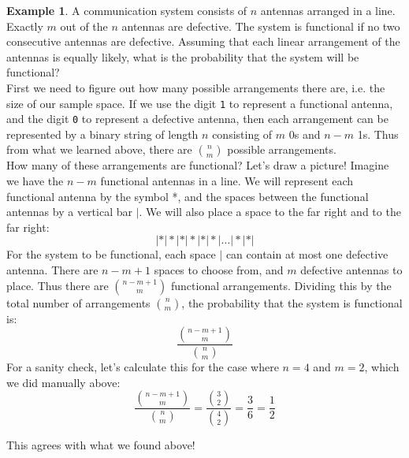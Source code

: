 \documentclass[12pt]{article}
\theoremstyle{definition}
\newtheorem*{example}{Example}
\theoremstyle{remark}
\begin{document}
\begin{example}A communication system consists of $n$ antennas arranged in a line. Exactly $m$ out of the $n$ antennas are defective. The system is functional if no two consecutive antennas are defective. Assuming that each linear arrangement of the antennas is equally likely, what is the probability that the system will be functional?\\

First we need to figure out how many possible arrangements there are, i.e. the size of our sample space. If we use the digit \texttt{1} to represent a functional antenna, and the digit \texttt{0} to represent a defective antenna, then each arrangement can be represented by a binary string of length $n$ consisting of $m$ 0s and $n - m$ 1s. Thus from what we learned above, there are $\binom{n}{m}$ possible arrangements. \\

How many of these arrangements are functional? Let's draw a picture! Imagine we have the $n - m$ functional antennas in a line. We will represent each functional antenna by the symbol *, and the spaces between the functional antennas by a vertical bar $|$. We will also place a space to the far right and to the far right:
\[
| * | * | * | * | * | * | \dots | * | * |
\]
For the system to be functional, each space $|$ can contain at most one defective antenna. There are $n - m + 1$ spaces to choose from, and $m$ defective antennas to place. Thus there are $\binom{n-m+1}{m}$ functional arrangements. Dividing this by the total number of arrangements $\binom{n}{m}$, the probability that the system is functional is:
\[
\frac{ \binom{n-m+1}{m}}{\binom{n}{m}}
\]
For a sanity check, let's calculate this for the case where $n = 4$ and $m = 2$, which we did manually above:
\[
\frac{ \binom{n-m+1}{m}}{\binom{n}{m}} = \frac{\binom{3}{2}}{\binom{4}{2}} = \frac{3}{6} = \frac{1}{2}
\]
\end{example}
This agrees with what we found above!
\end{document}
